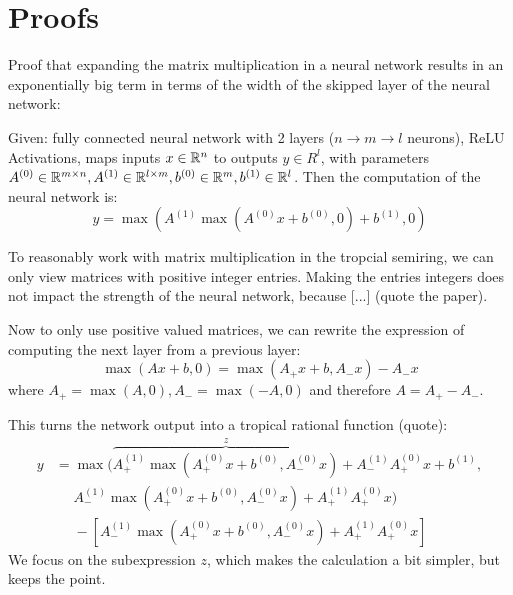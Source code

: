 \chapter{Proofs}
Proof that expanding the matrix multiplication in a neural network results in an exponentially big term in terms of the width of the skipped layer of the neural network:

Given: fully connected neural network with 2 layers ($n \rightarrow m \rightarrow l$ neurons), ReLU Activations, maps inputs $x \in \mathbb{R}^n$ to outputs $y \in R^l$, with parameters $A^{(0)} \in \mathbb{R}^{m \times n}, A^{(1)} \in \mathbb{R}^{l \times m}, b^{(0)} \in \mathbb{R}^m, b^{(1)} \in \mathbb{R}^l$.
Then the computation of the neural network is:
$$y = \max(A^{(1)}\max(A^{(0)}x + b^{(0)}, 0) + b^{(1)}, 0)$$

To reasonably work with matrix multiplication in the tropcial semiring, we can only view matrices with positive integer entries.
Making the entries integers does not impact the strength of the neural network, because [...] (quote the paper).

Now to only use positive valued matrices, we can rewrite the expression of computing the next layer from a previous layer:
$$\max(Ax + b, 0) = \max(A_+ x + b, A_- x) - A_- x$$
where $A_+ = \max(A, 0), A_- = \max(-A, 0)$ and therefore $A = A_+ - A_-$.

This turns the network output into a tropical rational function (quote):
\begin{align*}
    y & = \max(\overbrace{A^{(1)}_+ \max(A^{(0)}_+ x + b^{(0)}, A^{(0)}_- x)}^z + A^{(1)}_- A^{(0)}_+ x + b^{(1)}, \\
      & \phantom{{} =} A^{(1)}_- \max(A^{(0)}_+ x + b^{(0)}, A^{(0)}_- x) + A^{(1)}_+ A^{(0)}_+ x)                 \\
      & \phantom{{} =} -\left[A^{(1)}_- \max(A^{(0)}_+ x + b^{(0)}, A^{(0)}_- x) + A^{(1)}_+ A^{(0)}_+ x\right]
\end{align*}
We focus on the subexpression $z$, which makes the calculation a bit simpler, but keeps the point.

